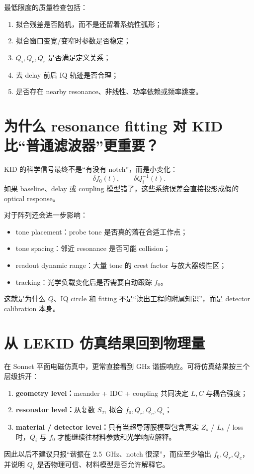 \documentclass[11pt,a4paper,openany]{ctexrep}
\begin{document}
最低限度的质量检查包括：
\begin{enumerate}
  \item 拟合残差是否随机，而不是还留着系统性弧形；
  \item 拟合窗口变宽/变窄时参数是否稳定；
  \item $Q_i,Q_c,Q_r$ 是否满足定义关系；
  \item 去 delay 前后 IQ 轨迹是否合理；
  \item 是否存在 nearby resonance、非线性、功率依赖或频率跳变。
\end{enumerate}

\section{为什么 resonance fitting 对 KID 比“普通滤波器”更重要？}

KID 的科学信号最终不是“有没有 notch”，而是小变化：
\[
\delta f_0(t),
\qquad
\delta Q_i^{-1}(t).
\]
如果 baseline、delay 或 coupling 模型错了，这些系统误差会直接投影成假的 optical response。

对于阵列还会进一步影响：
\begin{itemize}
  \item tone placement：probe tone 是否真的落在合适工作点；
  \item tone spacing：邻近 resonance 是否可能 collision；
  \item readout dynamic range：大量 tone 的 crest factor 与放大器线性区；
  \item tracking：光学负载变化后是否需要自动跟踪 $f_0$。
\end{itemize}

这就是为什么 $Q$、IQ circle 和 fitting 不是“读出工程的附属知识”，而是 detector calibration 本身。

\section{从 LEKID 仿真结果回到物理量}

\begin{projectbox}
在 Sonnet 平面电磁仿真中，更常直接看到 GHz 谐振响应。可将仿真结果按三个层级拆开：
\begin{enumerate}
  \item \textbf{geometry level：}meander + IDC + coupling 共同决定 $L,C$ 与耦合强度；
  \item \textbf{resonator level：}从复数 $S_{21}$ 拟合 $f_0,Q_r,Q_c,Q_i$；
  \item \textbf{material / detector level：}只有当超导薄膜模型包含真实 $Z_s$ / $L_k$ / loss 时，$Q_i$ 与 $f_0$ 才能继续往材料参数和光学响应解释。
\end{enumerate}
因此以后不建议只报“谐振在 \SI{2.5}{GHz}、notch 很深”，而应至少输出 $f_0,Q_r,Q_c$，并说明 $Q_i$ 是否物理可信、材料模型是否允许解释它。
\end{projectbox}
\end{document}
